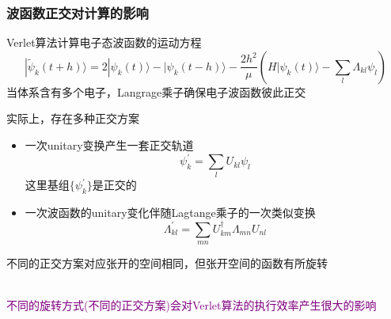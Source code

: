 \frame
{
	\frametitle{波函数正交对计算的影响}
	{\fontsize{9.0pt}{5.2pt}\selectfont
	\textrm{Verlet}算法计算电子态波函数的运动方程
	\begin{displaymath}
		|\tilde\psi_k(t+h)\rangle=2|\psi_k(t)\rangle-|\psi_k(t-h)\rangle-\dfrac{2h^2}{\mu}(H|\psi_k(t)\rangle-\sum_l\Lambda_{kl}\psi_l)
	\end{displaymath}}
	当体系含有多个电子，\textrm{Langrage}乘子确保电子波函数彼此正交\\%
	{\fontsize{7.0pt}{5.2pt}\selectfont
	实际上，存在多种正交方案
	\begin{itemize}
		\item 一次\textrm{unitary}变换产生一套正交轨道
			\begin{displaymath}
				\psi_k^{\prime}=\sum_lU_{kl}\psi_l
			\end{displaymath}
			这里基组$\{\psi_k^{\prime}\}$是正交的
		\item 一次波函数的\textrm{unitary}变化伴随\textrm{Lagtange}乘子的一次类似变换
			\begin{displaymath}
				\Lambda_{kl}^{\prime}=\sum_{mn}U_{km}^{\dagger}\Lambda_{mn}U_{nl}
			\end{displaymath}
	\end{itemize}
	不同的正交方案对应张开的空间相同，但张开空间的函数有所旋转
}\\
	{\fontsize{8.0pt}{5.2pt}\selectfont
	\textcolor{purple}{不同的旋转方式(不同的正交方案)会对\textrm{Verlet}算法的执行效率产生很大的影响}
}
	{\fontsize{9.0pt}{5.2pt}\selectfont
}
}

